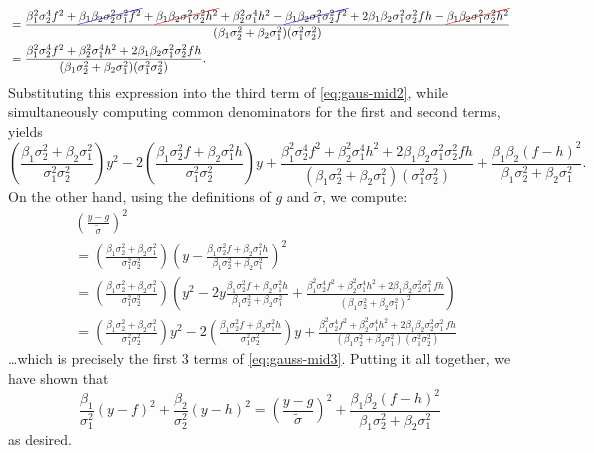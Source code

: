 \begin{subappendices}
\begin{lproof}
\begin{align*}
		&= \frac {
				\beta_1^2\sigma_2^4 f^2
				+ \Cancel[blue]{ \beta_1\beta_2\sigma_2^2 \sigma_1^2 f^2}
				+ \Cancel[red]{ \beta_1\beta_2 \sigma_1^2\sigma_2^2 h^2}
				+ \beta_2^2\sigma_1^4 h^2
				- \Cancel[blue]{\beta_1\beta_2 \sigma_1^2\sigma_2^2 f^2 }
				+ 2 \beta_1\beta_2 \sigma_1^2\sigma_2^2 f h
				- \Cancel[red]{\beta_1\beta_2 \sigma_1^2\sigma_2^2 h^2}
			} {(\beta_1 \sigma_2^2 + \beta_2 \sigma_1^2) (\sigma_1^2\sigma_2^2)} \\
		&= \frac {
				\beta_1^2\sigma_2^4 f^2
				+ \beta_2^2\sigma_1^4 h^2
				+ 2 \beta_1\beta_2 \sigma_1^2\sigma_2^2 f h
			} {(\beta_1 \sigma_2^2 + \beta_2 \sigma_1^2) (\sigma_1^2\sigma_2^2)}.
	\end{align*}
	Substituting this expression into the third term of \eqref{eq:gaus-mid2}, while simultaneously computing common denominators for the first and second terms, yields
	\begin{equation}
		\!\left(\!	\frac{\beta_1\sigma_2^2 + \beta_2 \sigma_1^2}
				{\sigma_1^2\sigma_2^2}  \!\right)\!  y^2
		- 2 \! \left(\!\frac
			{\beta_1 \sigma_2^2 f + \beta_2 \sigma_1^2 h}
			{\sigma_1^2\sigma_2^2} \!\right)\! y
		+
			\frac {
				\beta_1^2\sigma_2^4 f^2
				+ \beta_2^2\sigma_1^4 h^2
				+ 2 \beta_1\beta_2 \sigma_1^2\sigma_2^2 f h
			} {(\beta_1 \sigma_2^2 + \beta_2 \sigma_1^2) (\sigma_1^2\sigma_2^2)}
		+\frac{\beta_1\beta_2(f-h)^2}{\beta_1 \sigma_2^2 + \beta_2 \sigma_1^2}.
		\label{eq:gauss-mid3}
	\end{equation}
	On the other hand, using the definitions of $g$ and $\tilde \sigma$, we compute:
	\begin{align*}
		 &\left(\frac{y-g}{\tilde\sigma}\right)^2 \\
		 &=  \left(
				\frac{\beta_1\sigma_2^2 + \beta_2\sigma_1^2}{\sigma_1^2\sigma_2^2}
			\right) \left(
				y -	\frac
				{\beta_1 \sigma_2^2 f + \beta_2 \sigma_1^2 h}
				{\beta_1\sigma_2^2 + \beta_2 \sigma_1^2}
			\right)^2 \\
			&=  \left(
				\frac{\beta_1\sigma_2^2 + \beta_2\sigma_1^2}{\sigma_1^2\sigma_2^2}
			\right) \left(
				y^2  -	2y\frac
				{\beta_1 \sigma_2^2 f + \beta_2 \sigma_1^2 h}
				{\beta_1 \sigma_2^2 + \beta_2 \sigma_1^2}
				+\frac
				{\beta_1^2 \sigma_2^4 f^2 + \beta_2^2 \sigma_1^4 h^2
					+2 \beta_1 \beta_2 \sigma_2^2 \sigma_1^2\, f  h}
				{(\beta_1 \sigma_2^2 + \beta_2 \sigma_1^2)^2}
			\right) \\
			&=
				\left(\frac{\beta_1 \sigma_2^2 + \beta_2 \sigma_1^2}{\sigma_1^2\sigma_2^2}\right)y^2
				- 2\left(\frac
					{\beta_1 \sigma_2^2 f + \beta_2 \sigma_1^2 h}
					{\sigma_1^2\sigma_2^2}\right)y
				+\frac
				{\beta_1^2 \sigma_2^4 f^2 + \beta_2^2 \sigma_1^4 h^2
					+2 \beta_1 \beta_2 \sigma_2^2 \sigma_1^2\, f  h}
				{(\beta_1 \sigma_2^2 + \beta_2 \sigma_1^2)(\sigma_1^2\sigma_2^2)}
	\end{align*}
	\ldots which is precisely the first 3 terms of \eqref{eq:gauss-mid3}. Putting it all together, we have shown that
	\[
		\frac{\beta_1}{\sigma_1^2}(y - f)^2 + \frac{\beta_2}{\sigma_2^2}(y-h)^2 =
		\left(\frac{y-g}{\tilde\sigma}\right)^2
		+\frac{\beta_1\beta_2(f-h)^2}{\beta_1 \sigma_2^2 + \beta_2 \sigma_1^2}
	\]
	as desired.
\end{lproof}



\end{subappendices}

